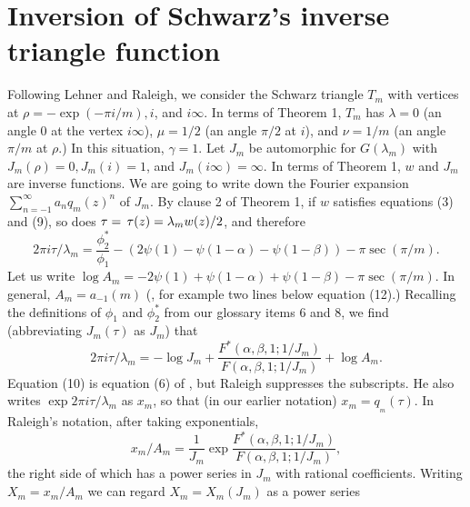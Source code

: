 \documentclass{article}
\begin{document}
\section[]{Inversion of Schwarz's 
inverse triangle function}
Following Lehner and Raleigh,
we consider the Schwarz triangle
$T_m$ with vertices at 
$\rho = -\exp(-\pi i/m), i$,
and $i\infty$. 
In terms of
Theorem 1,
$T_m$ has
$\lambda = 0$
(an angle $0$ at 
the vertex $i\infty$), $\mu = 1/2$
(an angle $\pi/2$ at $i$),
and $\nu = 1/m$ (an angle $\pi/m$
at $\rho$.)
 In this situation, $\gamma = 1$. 
 \newline \newline \noindent
 Let $J_m$ be automorphic for 
 $G(\lambda_m)$ with
 $J_m(\rho) = 0, J_m(i) = 1$,
 and $J_m(i \infty) = \infty$.
 In terms of Theorem 1, $w$
 and $J_m$ are inverse functions.
 We are going to write
 down the Fourier expansion
 $\sum_{n = -1}^{\infty} a_n q_m(z)^n$
 of $J_m$.
 \newline \newline \noindent
By clause 2 of Theorem 1, if $w$ satisfies 
equations (3) and (9), so does
$\tau = \thinspace \tau(z) = \lambda_m w(z)/2$, 
and therefore
$$
2\pi i\tau /\lambda_m =
 \frac{\phi_2^*}{\phi_1} - \left (2 \psi(1) - 
\psi(1 - \alpha)
- \psi(1-\beta) \right ) - 
\pi  \sec(\pi/m).
$$
Let us write
$\log A_m = -2 \psi(1) + \psi(1 - \alpha)
+ \psi(1 - \beta)  - \pi \sec(\pi/m).$ 
In general, $A_m = a_{-1}(m)$
(\cite{raleigh1962fourier},
for example two lines below equation (12).)
Recalling the definitions of 
$\phi_1$ and $\phi_2^*$
from our glossary items 6 and 8, 
we find (abbreviating $J_m(\tau)$ as $J_m$) that 
\begin{equation}
2\pi i\tau /\lambda_m 
  = - \log J_m
+ \frac {F^*(\alpha, \beta, 1;1/J_m)}
{F(\alpha, \beta, 1;1/J_m)} +  
\log A_m.
\end{equation}
Equation (10) is equation (6) of 
\cite{raleigh1962fourier},
but Raleigh  suppresses the 
subscripts.
He also writes 
$\exp 2 \pi i \tau/\lambda_m$ as $x_m$, 
so that (in our earlier notation)
$x_m = q_{_m}(\tau)$.
\newline \newline \noindent
In Raleigh's notation, after taking
exponentials,
\begin{equation}
 x_m/A_m = 
\frac 1{J_m} \exp 
\frac {F^*(\alpha, \beta, 1;1/J_m)}
{F(\alpha, \beta, 1;1/J_m)},
\end{equation}
the right side of
which has a power series in $J_m$ with
rational coefficients. 
Writing $X_m = x_m/A_m$
we can regard $X_m = X_m(J_m)$ as a power series
\end{document}
